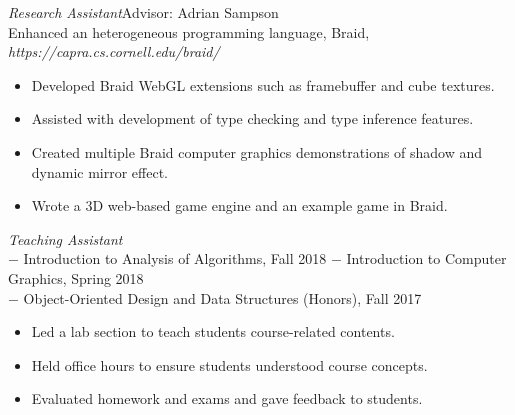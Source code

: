 \documentclass{resume}
\begin{document}
\textit{Research Assistant}\quad Advisor: Adrian Sampson\\
Enhanced an heterogeneous programming language, Braid, \textit{https://capra.cs.cornell.edu/braid/}
\begin{itemize}
  \item Developed Braid WebGL extensions such as framebuffer and cube textures.
  \item Assisted with development of type checking and type inference features.
  \item Created multiple Braid computer graphics demonstrations of shadow and dynamic mirror effect.
  \item Wrote a 3D web-based game engine and an example game in Braid.
\end{itemize}

\textit{Teaching Assistant}\\
$-$ Introduction to Analysis of Algorithms, Fall 2018 \quad $-$ Introduction to Computer Graphics, Spring 2018\\
$-$ Object-Oriented Design and Data Structures (Honors), Fall 2017
\begin{itemize}
  \item Led a lab section to teach students course-related contents.
  \item Held office hours to ensure students understood course concepts.
  \item Evaluated homework and exams and gave feedback to students.
\end{itemize}
\end{document}
